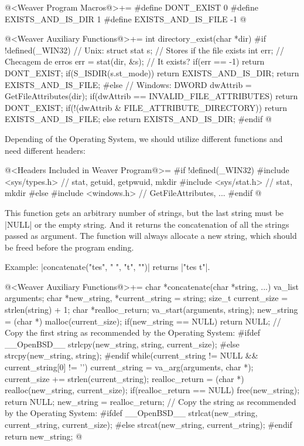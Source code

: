 \iniciocodigo
@<Weaver Program Macros@>+=
#define DONT_EXIST         0
#define EXISTS_AND_IS_DIR   1
#define EXISTS_AND_IS_FILE -1
@
\fimcodigo

\iniciocodigo
@<Weaver Auxiliary Functions@>+=
int directory_exist(char *dir){
#if !defined(_WIN32)
  // Unix:
  struct stat s; // Stores if the file exists
  int err; // Checagem de erros
  err = stat(dir, &s); // It exists?
  if(err == -1) return DONT_EXIST;
  if(S_ISDIR(s.st_mode)) return EXISTS_AND_IS_DIR;
  return EXISTS_AND_IS_FILE;
#else
  // Windows:
  DWORD dwAttrib = GetFileAttributes(dir);
  if(dwAttrib == INVALID_FILE_ATTRIBUTES) return DONT_EXIST;
  if(!(dwAttrib & FILE_ATTRIBUTE_DIRECTORY)) return EXISTS_AND_IS_FILE;
  else return EXISTS_AND_IS_DIR;
#endif
}
@
\fimcodigo

Depending of the Operating System, we should utilize different
functions and need different headers:

\iniciocodigo
@<Headers Included in Weaver Program@>=
#if !defined(_WIN32)
#include <sys/types.h> // stat, getuid, getpwuid, mkdir
#include <sys/stat.h> // stat, mkdir
#else
#include <windows.h> // GetFileAttributes, ...
#endif
@
\fimcodigo


This function gets an arbitrary number of strings, but the last string
must be |NULL| or the empty string. And it returns the concatenation
of all the strings passed as argument. The function will always
allocate a new string, which should be freed before the program
ending.

Example: |concatenate("tes", " ", "t", "")| returns |"tes t"|.

\iniciocodigo
@<Weaver Auxiliary Functions@>+=
char *concatenate(char *string, ...){
  va_list arguments;
  char *new_string, *current_string = string;
  size_t current_size = strlen(string) + 1;
  char *realloc_return;
  va_start(arguments, string);
  new_string = (char *) malloc(current_size);
  if(new_string == NULL) return NULL;
   // Copy the first string as recommended by the Operating System:
#ifdef __OpenBSD__
  strlcpy(new_string, string, current_size);
#else
  strcpy(new_string, string);
#endif
  while(current_string != NULL && current_string[0] != '\0'){
    current_string = va_arg(arguments, char *);
    current_size += strlen(current_string);
    realloc_return = (char *) realloc(new_string, current_size);
    if(realloc_return == NULL){
      free(new_string);
      return NULL;
    }
    new_string = realloc_return;
     // Copy the string as recommended by the Operating System:
#ifdef __OpenBSD__
    strlcat(new_string, current_string, current_size);
#else
    strcat(new_string, current_string);
#endif
  }
  return new_string;
}
@
\fimcodigo

